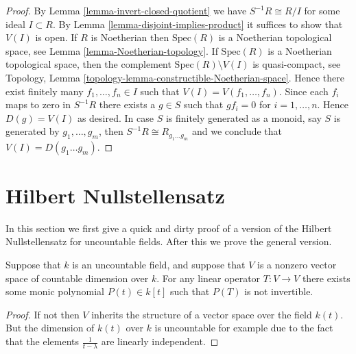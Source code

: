 \begin{proof}
By Lemma \ref{lemma-invert-closed-quotient} we have $S^{-1}R \cong R/I$
for some ideal $I \subset R$. By Lemma \ref{lemma-disjoint-implies-product}
it suffices to show that $V(I)$ is open.
If $R$ is Noetherian then $\text{Spec}(R)$ is a Noetherian
topological space, see Lemma \ref{lemma-Noetherian-topology}.
If $\text{Spec}(R)$ is a Noetherian topological space,
then the complement $\text{Spec}(R) \setminus V(I)$ is quasi-compact,
see Topology, Lemma \ref{topology-lemma-constructible-Noetherian-space}.
Hence there exist finitely many $f_1, \ldots, f_n \in I$ such
that $V(I) = V(f_1, \ldots, f_n)$.
Since each $f_i$ maps to zero in $S^{-1}R$
there exists a $g \in S$ such that $gf_i = 0$ for
$i = 1, \ldots, n$. Hence $D(g) = V(I)$ as desired.
In case $S$ is finitely generated as a monoid, say $S$ is generated
by $g_1, \ldots, g_m$, then $S^{-1}R \cong R_{g_1 \ldots g_m}$
and we conclude that $V(I) = D(g_1 \ldots g_m)$.
\end{proof}














\section{Hilbert Nullstellensatz}
\label{section-nullstellensatz}

\noindent
In this section we first give a quick and dirty proof
of a version of the Hilbert Nullstellensatz for uncountable
fields. After this we prove the general version.

\begin{lemma}
\label{lemma-dimension}
Suppose that $k$ is an uncountable field,
and suppose that $V$ is a nonzero vector
space of countable dimension over $k$.
For any linear operator $T : V \to V$ there exists
some monic polynomial $P(t) \in k[t]$ such that
$P(T)$ is not invertible.
\end{lemma}

\begin{proof}
If not then $V$ inherits the structure of a vector space over
the field $k(t)$. But the dimension of $k(t)$ over $k$ is
uncountable for example due to the fact that the elements
$\frac{1}{t - \lambda}$ are linearly independent.
\end{proof}

